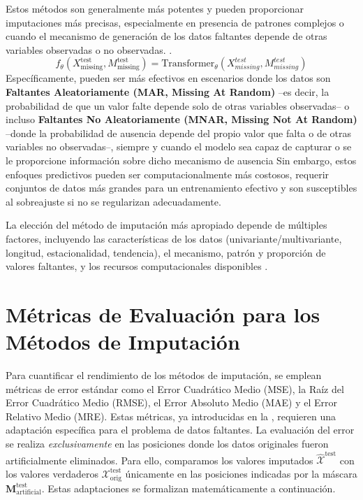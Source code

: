 \begin{itemize}
\begin{itemize}
        \end{itemize}
        Estos métodos son generalmente más potentes y pueden proporcionar imputaciones más precisas, especialmente en presencia de patrones complejos o cuando el mecanismo de generación de los datos faltantes depende de otras variables observadas o no observadas. 
        \citep{Rubin1976inference, Little2019statistical}. 
        \begin{equation}
        f_{\theta}(X^{\text{test}}_{\text{missing}}, M^{\text{test}}_{\text{missing}}) = \text{Transformer}_\theta({X_{missing}^{test}}, M_{missing}^{test})
        \end{equation}
        Específicamente, pueden ser más efectivos en escenarios donde los datos son \textbf{Faltantes Aleatoriamente (MAR, Missing At Random)} –es decir, la probabilidad de que un valor falte depende solo de otras variables observadas– o incluso \textbf{Faltantes No Aleatoriamente (MNAR, Missing Not At Random)} –donde la probabilidad de ausencia depende del propio valor que falta o de otras variables no observadas–, siempre y cuando el modelo sea capaz de capturar o se le proporcione información sobre dicho mecanismo de ausencia 
        Sin embargo, estos enfoques predictivos pueden ser computacionalmente más costosos, requerir conjuntos de datos más grandes para un entrenamiento efectivo y son susceptibles al sobreajuste si no se regularizan adecuadamente.
\end{itemize}
La elección del método de imputación más apropiado depende de múltiples factores, incluyendo las características de los datos (univariante/multivariante, longitud, estacionalidad, tendencia), el mecanismo, patrón y proporción de valores faltantes, y los recursos computacionales disponibles \citep{Rubin1976inference, VanBuuren2018flexible}.


\section{Métricas de Evaluación para los Métodos de Imputación}
\label{sec:evaluation_metrics_hadamard}

Para cuantificar el rendimiento de los métodos de imputación, se emplean métricas de error estándar como el Error Cuadrático Medio (MSE), la Raíz del Error Cuadrático Medio (RMSE), el Error Absoluto Medio (MAE) y el Error Relativo Medio (MRE). Estas métricas, ya introducidas en la , requieren una adaptación específica para el problema de datos faltantes. La evaluación del error se realiza \textit{exclusivamente} en las posiciones donde los datos originales fueron artificialmente eliminados. Para ello, comparamos los valores imputados $\hat{\mathcal{X}}^{\text{test}}$ con los valores verdaderos $\mathcal{X}_{\text{orig}}^{\text{test}}$ únicamente en las posiciones indicadas por la máscara $\mathbf{M}_{\text{artificial}}^{\text{test}}$. Estas adaptaciones se formalizan matemáticamente a continuación.

